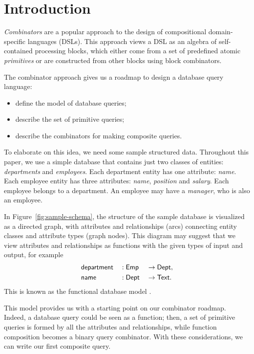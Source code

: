 
\section{Introduction}
\label{sec:introduction}

\emph{Combinators} are a popular approach to the design of compositional
domain-specific languages (DSLs). This approach views a DSL as an algebra of
self-con\-tained processing blocks, which either come from a set of predefined
atomic \emph{primitives} or are constructed from other blocks using block
combinators.

The combinator approach gives us a roadmap to design a database query language:

\begin{itemize}
\item
define the model of database queries;

\item
describe the set of primitive queries;

\item
describe the combinators for making composite queries.
\end{itemize}

To elaborate on this idea, we need some sample structured data.  Throughout
this paper, we use a simple database that contains just two classes of
entities: \emph{departments} and \emph{employees}.  Each department entity has
one attribute: \emph{name}.  Each employee entity has three attributes:
\emph{name}, \emph{position} and \emph{salary}.  Each employee belongs to a
department.  An employee may have a \emph{manager}, who is also an employee.

In Figure~\ref{fig:sample-schema}, the structure of the sample database is
visualized as a directed graph, with attributes and relationships (arcs)
connecting entity classes and attribute types (graph nodes).  This diagram may
suggest that we view attributes and relationships as functions with the given
types of input and output, for example
\begin{alignat*}{3}
    & \mathsf{department} && : \mathsf{Emp} && \to \mathsf{Dept}, \\
    & \mathsf{name} && : \mathsf{Dept} && \to \mathsf{Text}.
\end{alignat*}
This is known as the functional database model \cite{Kerschberg1976,
Sibley1977}.



This model provides us with a starting point on our combinator roadmap.
Indeed, a database query could be seen as a function; then, a set of primitive
queries is formed by all the attributes and relationships, while function
composition becomes a binary query combinator.  With these considerations, we
can write our first composite query.

